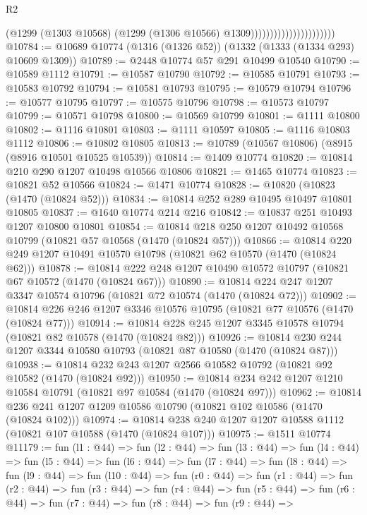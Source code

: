 \begin{lexlean}{R2}
\begin{coremodule}
                                            (@1299
                                              (@1303 @10568)
                                              (@1299 (@1306 @10566) @1309))))))))))))))))))))))
@10784 := @10689 @10774 (@1316 (@1326 @52)) (@1332 (@1333 (@1334 @293) @10609 @1309))
@10789 := @2448 @10774 @57 @291 @10499 @10540
@10790 := @10589 @1112
@10791 := @10587 @10790
@10792 := @10585 @10791
@10793 := @10583 @10792
@10794 := @10581 @10793
@10795 := @10579 @10794
@10796 := @10577 @10795
@10797 := @10575 @10796
@10798 := @10573 @10797
@10799 := @10571 @10798
@10800 := @10569 @10799
@10801 := @1111 @10800
@10802 := @1116 @10801
@10803 := @1111 @10597
@10805 := @1116 @10803 @1112
@10806 := @10802 @10805
@10813 := @10789 (@10567 @10806) (@8915 (@8916 @10501 @10525 @10539))
@10814 := @1409 @10774
@10820 := @10814 @210 @290 @1207 @10498 @10566 @10806
@10821 := @1465 @10774
@10823 := @10821 @52 @10566
@10824 := @1471 @10774
@10828 := @10820 (@10823 (@1470 (@10824 @52)))
@10834 := @10814 @252 @289 @10495 @10497 @10801 @10805
@10837 := @1640 @10774 @214 @216
@10842 := @10837 @251 @10493 @1207 @10800 @10801
@10854 := @10814 @218 @250 @1207 @10492 @10568 @10799 (@10821 @57 @10568 (@1470 (@10824 @57)))
@10866 := @10814 @220 @249 @1207 @10491 @10570 @10798 (@10821 @62 @10570 (@1470 (@10824 @62)))
@10878 := @10814 @222 @248 @1207 @10490 @10572 @10797 (@10821 @67 @10572 (@1470 (@10824 @67)))
@10890 := @10814 @224 @247 @1207 @3347 @10574 @10796 (@10821 @72 @10574 (@1470 (@10824 @72)))
@10902 := @10814 @226 @246 @1207 @3346 @10576 @10795 (@10821 @77 @10576 (@1470 (@10824 @77)))
@10914 := @10814 @228 @245 @1207 @3345 @10578 @10794 (@10821 @82 @10578 (@1470 (@10824 @82)))
@10926 := @10814 @230 @244 @1207 @3344 @10580 @10793 (@10821 @87 @10580 (@1470 (@10824 @87)))
@10938 := @10814 @232 @243 @1207 @2566 @10582 @10792 (@10821 @92 @10582 (@1470 (@10824 @92)))
@10950 := @10814 @234 @242 @1207 @1210 @10584 @10791 (@10821 @97 @10584 (@1470 (@10824 @97)))
@10962 := @10814 @236 @241 @1207 @1209 @10586 @10790 (@10821 @102 @10586 (@1470 (@10824 @102)))
@10974 := @10814 @238 @240 @1207 @1207 @10588 @1112 (@10821 @107 @10588 (@1470 (@10824 @107)))
@10975 := @1511 @10774
@11179 := fun (l1 : @44) =>
  fun (l2 : @44) =>
  fun (l3 : @44) =>
  fun (l4 : @44) =>
  fun (l5 : @44) =>
  fun (l6 : @44) =>
  fun (l7 : @44) =>
  fun (l8 : @44) =>
  fun (l9 : @44) =>
  fun (l10 : @44) =>
  fun (r0 : @44) =>
  fun (r1 : @44) =>
  fun (r2 : @44) =>
  fun (r3 : @44) =>
  fun (r4 : @44) =>
  fun (r5 : @44) =>
  fun (r6 : @44) =>
  fun (r7 : @44) =>
  fun (r8 : @44) =>
  fun (r9 : @44) =>

\end{coremodule}
\end{lexlean}

